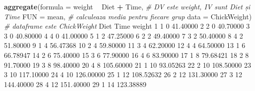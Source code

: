 \documentclass[]{article}
\newenvironment{Shaded}{\begin{snugshade}}{\end{snugshade}}
\newcommand{\KeywordTok}[1]{\textcolor[rgb]{0.13,0.29,0.53}{\textbf{#1}}}
\newcommand{\DataTypeTok}[1]{\textcolor[rgb]{0.13,0.29,0.53}{#1}}
\newcommand{\DecValTok}[1]{\textcolor[rgb]{0.00,0.00,0.81}{#1}}
\newcommand{\FloatTok}[1]{\textcolor[rgb]{0.00,0.00,0.81}{#1}}
\newcommand{\StringTok}[1]{\textcolor[rgb]{0.31,0.60,0.02}{#1}}
\newcommand{\CommentTok}[1]{\textcolor[rgb]{0.56,0.35,0.01}{\textit{#1}}}
\newcommand{\OperatorTok}[1]{\textcolor[rgb]{0.81,0.36,0.00}{\textbf{#1}}}
\newcommand{\NormalTok}[1]{#1}
\begin{document}
\begin{Shaded}
\begin{Highlighting}[]
\KeywordTok{aggregate}\NormalTok{(}\DataTypeTok{formula =}\NormalTok{ weight }\OperatorTok{~}\StringTok{ }\NormalTok{Diet }\OperatorTok{+}\StringTok{ }\NormalTok{Time,  }\CommentTok{# DV este weight, IV sunt Diet și Time}
          \DataTypeTok{FUN =}\NormalTok{ mean,               }\CommentTok{# calculeaza media pentru fiecare grup}
          \DataTypeTok{data =}\NormalTok{ ChickWeight)       }\CommentTok{# dataframe este ChickWeight}
\NormalTok{   Diet Time    weight}
\DecValTok{1}     \DecValTok{1}    \DecValTok{0}  \FloatTok{41.40000}
\DecValTok{2}     \DecValTok{2}    \DecValTok{0}  \FloatTok{40.70000}
\DecValTok{3}     \DecValTok{3}    \DecValTok{0}  \FloatTok{40.80000}
\DecValTok{4}     \DecValTok{4}    \DecValTok{0}  \FloatTok{41.00000}
\DecValTok{5}     \DecValTok{1}    \DecValTok{2}  \FloatTok{47.25000}
\DecValTok{6}     \DecValTok{2}    \DecValTok{2}  \FloatTok{49.40000}
\DecValTok{7}     \DecValTok{3}    \DecValTok{2}  \FloatTok{50.40000}
\DecValTok{8}     \DecValTok{4}    \DecValTok{2}  \FloatTok{51.80000}
\DecValTok{9}     \DecValTok{1}    \DecValTok{4}  \FloatTok{56.47368}
\DecValTok{10}    \DecValTok{2}    \DecValTok{4}  \FloatTok{59.80000}
\DecValTok{11}    \DecValTok{3}    \DecValTok{4}  \FloatTok{62.20000}
\DecValTok{12}    \DecValTok{4}    \DecValTok{4}  \FloatTok{64.50000}
\DecValTok{13}    \DecValTok{1}    \DecValTok{6}  \FloatTok{66.78947}
\DecValTok{14}    \DecValTok{2}    \DecValTok{6}  \FloatTok{75.40000}
\DecValTok{15}    \DecValTok{3}    \DecValTok{6}  \FloatTok{77.90000}
\DecValTok{16}    \DecValTok{4}    \DecValTok{6}  \FloatTok{83.90000}
\DecValTok{17}    \DecValTok{1}    \DecValTok{8}  \FloatTok{79.68421}
\DecValTok{18}    \DecValTok{2}    \DecValTok{8}  \FloatTok{91.70000}
\DecValTok{19}    \DecValTok{3}    \DecValTok{8}  \FloatTok{98.40000}
\DecValTok{20}    \DecValTok{4}    \DecValTok{8} \FloatTok{105.60000}
\DecValTok{21}    \DecValTok{1}   \DecValTok{10}  \FloatTok{93.05263}
\DecValTok{22}    \DecValTok{2}   \DecValTok{10} \FloatTok{108.50000}
\DecValTok{23}    \DecValTok{3}   \DecValTok{10} \FloatTok{117.10000}
\DecValTok{24}    \DecValTok{4}   \DecValTok{10} \FloatTok{126.00000}
\DecValTok{25}    \DecValTok{1}   \DecValTok{12} \FloatTok{108.52632}
\DecValTok{26}    \DecValTok{2}   \DecValTok{12} \FloatTok{131.30000}
\DecValTok{27}    \DecValTok{3}   \DecValTok{12} \FloatTok{144.40000}
\DecValTok{28}    \DecValTok{4}   \DecValTok{12} \FloatTok{151.40000}
\DecValTok{29}    \DecValTok{1}   \DecValTok{14} \FloatTok{123.38889}

\end{Highlighting}
\end{Shaded}
\end{document}
